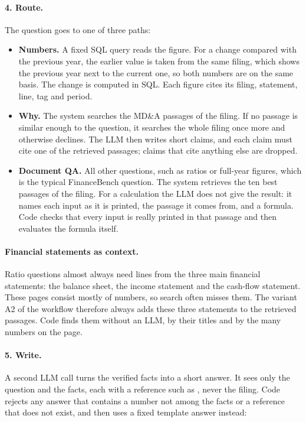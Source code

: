 \paragraph{4. Route.} The question goes to one of three paths:
\begin{itemize}
  \item \textbf{Numbers.} A fixed SQL query reads the figure. For a change compared with the previous
        year, the earlier value is taken from the same filing, which shows the previous year next to
        the current one, so both numbers are on the same basis. The change is computed in SQL. Each
        figure cites its filing, statement, line, tag and period.
  \item \textbf{Why.} The system searches the MD\&A passages of the filing. If no passage is similar
        enough to the question, it searches the whole filing once more and otherwise declines. The
        LLM then writes short claims, and each claim must cite one of the retrieved passages; claims
        that cite anything else are dropped.
  \item \textbf{Document QA.} All other questions, such as ratios or full-year figures, which is the
        typical FinanceBench question. The system retrieves the ten best passages of the filing. For
        a calculation the LLM does not give the result: it names each input as it is printed, the
        passage it comes from, and a formula. Code checks that every input is really printed in that
        passage and then evaluates the formula itself.
\end{itemize}

\paragraph{Financial statements as context.} Ratio questions almost always need lines from the three
main financial statements: the balance sheet, the income statement and the cash-flow statement. These
pages consist mostly of numbers, so search often misses them. The variant A2 of the workflow
therefore always adds these three statements to the retrieved passages. Code finds them without an
LLM, by their titles and by the many numbers on the page.

\paragraph{5. Write.} A second LLM call turns the verified facts into a short answer. It sees only the
question and the facts, each with a reference such as \code{[F1]}, never the filing. Code rejects any
answer that contains a number not among the facts or a reference that does not exist, and then
uses a fixed template answer instead:

